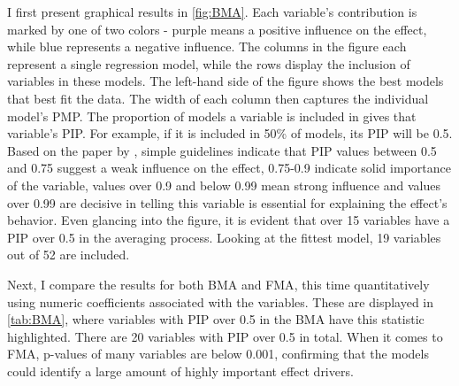 I first present graphical results in \autoref{fig:BMA}. Each variable's contribution is marked by one of two colors - purple means a positive influence on the effect, while blue represents a negative influence. The columns in the figure each represent a single regression model, while the rows display the inclusion of variables in these models. The left-hand side of the figure shows the best models that best fit the data. The width of each column then captures the individual model's \ac{PMP}. The proportion of models a variable is included in gives that variable's \ac{PIP}. For example, if it is included in 50\% of models, its \ac{PIP} will be 0.5. Based on the paper by \cite{kass1995bayes}, simple guidelines indicate that \ac{PIP} values between 0.5 and 0.75 suggest a weak influence on the effect, 0.75-0.9 indicate solid importance of the variable, values over 0.9 and below 0.99 mean strong influence and values over 0.99 are decisive in telling this variable is essential for explaining the effect's behavior. Even glancing into the figure, it is evident that over 15 variables have a \ac{PIP} over 0.5 in the averaging process. Looking at the fittest model, 19 variables out of 52 are included.

Next, I compare the results for both \ac{BMA} and \ac{FMA}, this time quantitatively using numeric coefficients associated with the variables. These are displayed in \autoref{tab:BMA}, where variables with \ac{PIP} over 0.5 in the \ac{BMA} have this statistic highlighted. There are 20 variables with \ac{PIP} over 0.5 in total. When it comes to \ac{FMA}, p-values of many variables are below 0.001, confirming that the models could identify a large amount of highly important effect drivers.

